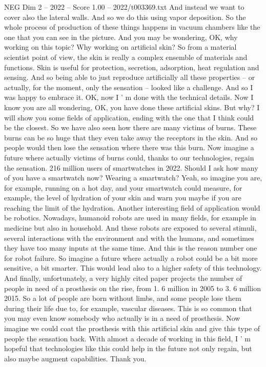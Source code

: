 \begin{textsample}{NEG Dim 2 – 2022 – Score 1.00 – 2022/t003369.txt}
And instead we want to cover also the lateral walls.
And so we do this using vapor deposition.
So the whole process of production of these things happens in vacuum chambers like the one that you can see in the picture.
And you may be wondering, OK, why working on this topic?
Why working on artificial skin?
So from a material scientist point of view, the skin is really a complex ensemble of materials and functions.
Skin is useful for protection, secretion, adsorption, heat regulation and sensing.
And so being able to just reproduce artificially all these properties -- or actually, for the moment, only the sensation -- looked like a challenge.
And so I was happy to embrace it.
OK, now I ' m done with the technical details.
Now I know you are all wondering, OK, you have done these artificial skins.
But why?
I will show you some fields of application, ending with the one that I think could be the closest.
So we have also seen how there are many victims of burns.
These burns can be so huge that they even take away the receptors in the skin.
And so people would then lose the sensation where there was this burn.
Now imagine a future where actually victims of burns could, thanks to our technologies, regain the sensation. 216 million users of smartwatches in 2022.
Should I ask how many of you have a smartwatch now?
Wearing a smartwatch?
Yeah, so imagine you are, for example, running on a hot day, and your smartwatch could measure, for example, the level of hydration of your skin and warn you maybe if you are reaching the limit of the hydration.
Another interesting field of application would be robotics.
Nowadays, humanoid robots are used in many fields, for example in medicine but also in household.
And these robots are exposed to several stimuli, several interactions with the environment and with the humans, and sometimes they have too many inputs at the same time.
And this is the reason number one for robot failure.
So imagine a future where actually a robot could be a bit more sensitive, a bit smarter.
This would lead also to a higher safety of this technology.
And finally, unfortunately, a very highly cited paper projects the number of people in need of a prosthesis on the rise, from 1. 6 million in 2005 to 3. 6 million 2015.
So a lot of people are born without limbs, and some people lose them during their life due to, for example, vascular diseases.
This is so common that you may even know somebody who actually is in a need of prosthesis.
Now imagine we could coat the prosthesis with this artificial skin and give this type of people the sensation back.
With almost a decade of working in this field, I ' m hopeful that technologies like this could help in the future not only regain, but also maybe augment capabilities.
Thank you.

\end{textsample}
